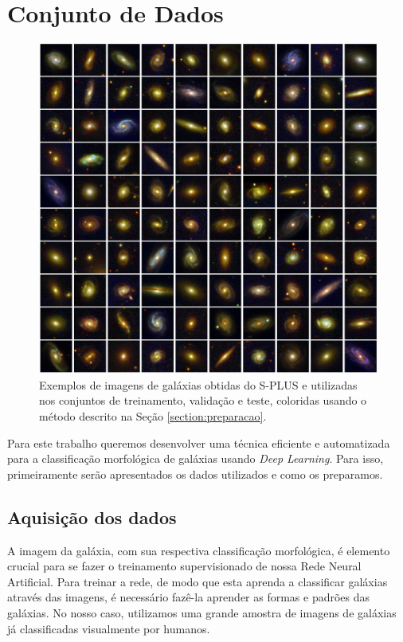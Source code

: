 \section{Conjunto de Dados}

\begin{figure}[!ht]
  \centering
  \includegraphics[width=\linewidth]{figures/galaxygrid_2}
  \caption{Exemplos de imagens de galáxias obtidas do S-PLUS e utilizadas nos conjuntos de treinamento, validação e teste, coloridas usando o método descrito na Seção \ref{section:preparacao}.}
  \label{fig:galaxy_grid}
\end{figure}


Para este trabalho queremos desenvolver uma técnica eficiente e automatizada para a  classificação morfológica de galáxias usando \emph{Deep Learning}. Para isso, primeiramente serão apresentados os dados utilizados e como os preparamos.

\subsection{Aquisição dos dados}

A imagem da galáxia, com sua respectiva classificação morfológica, é elemento crucial para se fazer o treinamento supervisionado de nossa Rede Neural Artificial. Para treinar a rede, de modo que esta aprenda a classificar galáxias através das imagens, é necessário fazê-la aprender as formas e padrões das galáxias. No nosso caso, utilizamos uma grande amostra de imagens de galáxias já classificadas visualmente por humanos.

